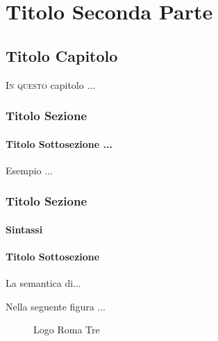 
\part{Titolo Seconda Parte}\label{seconda}   %
\chapter{Titolo Capitolo}
\lettrine[lines=1]{I}{n questo} capitolo ...

\section{Titolo Sezione}

\subsection{Titolo Sottosezione ...}

\begin{ex}
Esempio
...
\end{ex}

\section{Titolo Sezione}
\subsection{Sintassi}\label{sec:syntax2}

\subsection{Titolo Sottosezione}\label{sec:sem}
La semantica di...

\newpage
Nella seguente figura ...
\begin{figure}[h]
\begin{center}
\centerline {}
\end{center}
\caption{Logo Roma  Tre}
\end{figure}\label{fig:logoRM3}
